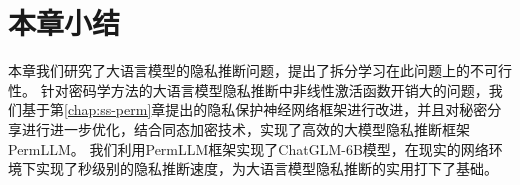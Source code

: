 \section{本章小结}
本章我们研究了大语言模型的隐私推断问题，提出了拆分学习在此问题上的不可行性。
%
针对密码学方法的大语言模型隐私推断中非线性激活函数开销大的问题，我们基于第\ref{chap:ss-perm}章提出的隐私保护神经网络框架进行改进，并且对秘密分享进行进一步优化，结合同态加密技术，实现了高效的大模型隐私推断框架PermLLM。
%
我们利用PermLLM框架实现了ChatGLM-6B模型，在现实的网络环境下实现了秒级别的隐私推断速度，为大语言模型隐私推断的实用打下了基础。